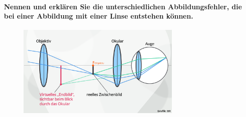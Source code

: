 \documentclass[a4paper, 11pt, parskip=half]{scrartcl}
\begin{document}
\paragraph{Nennen und erklären Sie die unterschiedlichen Abbildungsfehler, die bei einer Abbildung
mit einer Linse entstehen können.}

\begin{figure}[H]
    \centering
    \includegraphics[width=8cm]{image/18/geo23}
\end{figure}
\end{document}
